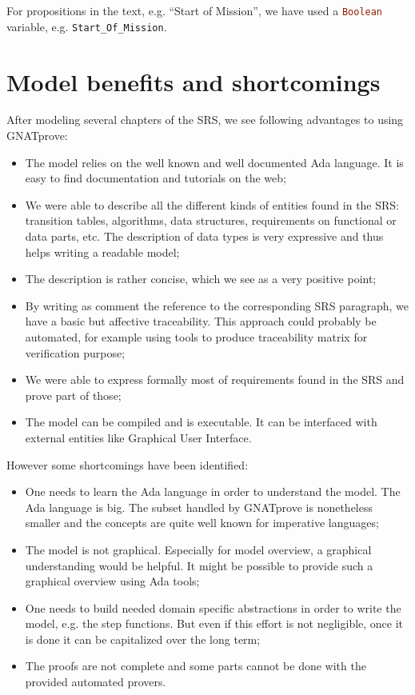 \documentclass{template/openetcs_report}
\newcommand{\Ada}[1]{\lstinline[language=Ada,basicstyle={\sffamily},framesep=0pt]{#1}}
\begin{document}
For propositions in the text, e.g. ``Start of Mission'', we have used
a \Ada{Boolean} variable, e.g. \Ada{Start_Of_Mission}.

\chapter{Model benefits and shortcomings}

After modeling several chapters of the SRS, we see following
advantages to using GNATprove:

\begin{itemize}
\item The model relies on the well known and well documented Ada
  language. It is easy to find documentation and tutorials on the web;
\item We were able to describe all the different kinds of entities
  found in the SRS: transition tables, algorithms, data structures,
  requirements on functional or data parts, etc. The description of
  data types is very expressive and thus helps writing a readable
  model;
\item The description is rather concise, which we see as a very
  positive point;
\item By writing as comment the reference to the corresponding SRS
  paragraph, we have a basic but affective traceability. This approach
  could probably be automated, for example using tools to produce
  traceability matrix for verification purpose;
\item We were able to express formally most of requirements found in
  the SRS and prove part of those;
\item The model can be compiled and is executable. It can be
  interfaced with external entities like Graphical User Interface.
\end{itemize}

However some shortcomings have been identified:
\begin{itemize}
\item One needs to learn the Ada language in order to understand the
  model. The Ada language is big. The subset handled by GNATprove is
  nonetheless smaller and the concepts are quite well known for
  imperative languages;
\item The model is not graphical. Especially for model overview, a
  graphical understanding would be helpful. It might be possible to
  provide such a graphical overview using Ada tools;
\item One needs to build needed domain specific abstractions in order
  to write the model, e.g. the step functions. But even if this effort
  is not negligible, once it is done it can be capitalized over the
  long term;
\item The proofs are not complete and some parts cannot be done with
  the provided automated provers.
\end{itemize}
\end{document}
